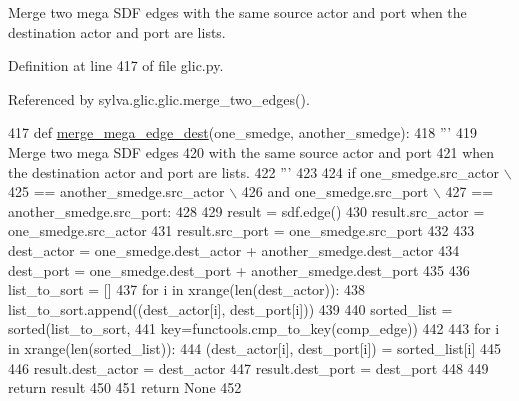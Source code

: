 \begin{DoxyVerb}  Merge two mega SDF edges
  with the same source actor and port
  when the destination actor and port are lists.
\end{DoxyVerb}
 

Definition at line 417 of file glic.\+py.



Referenced by sylva.\+glic.\+glic.\+merge\+\_\+two\+\_\+edges().


\begin{DoxyCode}
417     \textcolor{keyword}{def }\hyperlink{namespacesylva_1_1glic_1_1glic_a80e6906ee9b3a3c96085594f6dab2f84}{merge\_mega\_edge\_dest}(one\_smedge, another\_smedge):
418         \textcolor{stringliteral}{'''}
419 \textcolor{stringliteral}{          Merge two mega SDF edges}
420 \textcolor{stringliteral}{          with the same source actor and port}
421 \textcolor{stringliteral}{          when the destination actor and port are lists.}
422 \textcolor{stringliteral}{        '''}
423 
424         \textcolor{keywordflow}{if} one\_smedge.src\_actor \(\backslash\)
425                 == another\_smedge.src\_actor \(\backslash\)
426                 \textcolor{keywordflow}{and} one\_smedge.src\_port \(\backslash\)
427                 == another\_smedge.src\_port:
428 
429             result = sdf.edge()
430             result.src\_actor = one\_smedge.src\_actor
431             result.src\_port = one\_smedge.src\_port
432 
433             dest\_actor = one\_smedge.dest\_actor + another\_smedge.dest\_actor
434             dest\_port = one\_smedge.dest\_port + another\_smedge.dest\_port
435 
436             list\_to\_sort = []
437             \textcolor{keywordflow}{for} i \textcolor{keywordflow}{in} xrange(len(dest\_actor)):
438                 list\_to\_sort.append((dest\_actor[i], dest\_port[i]))
439 
440             sorted\_list = sorted(list\_to\_sort,
441                                  key=functools.cmp\_to\_key(comp\_edge))
442 
443             \textcolor{keywordflow}{for} i \textcolor{keywordflow}{in} xrange(len(sorted\_list)):
444                 (dest\_actor[i], dest\_port[i]) = sorted\_list[i]
445 
446             result.dest\_actor = dest\_actor
447             result.dest\_port = dest\_port
448 
449             \textcolor{keywordflow}{return} result
450 
451         \textcolor{keywordflow}{return} \textcolor{keywordtype}{None}
452 
\end{DoxyCode}
\mbox{\label{namespacesylva_1_1glic_1_1glic_aaa193270639d512daa1cf9fc2f952fdb}} 
